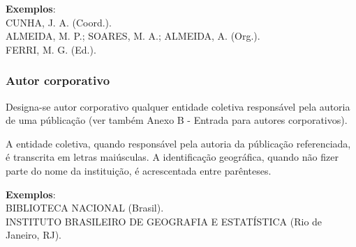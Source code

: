 \begin{exemplomanual}
\textbf{Exemplos}:\\
CUNHA, J. A. (Coord.).\\
ALMEIDA, M. P.; SOARES, M. A.; ALMEIDA, A. (Org.).\\
FERRI, M. G. (Ed.).
\end{exemplomanual}


\subsubsection{Autor corporativo}

Designa-se autor corporativo qualquer entidade coletiva responsável pela autoria de uma públicação (ver também Anexo B - Entrada para autores corporativos).

A entidade coletiva, quando responsável pela autoria da públicação referenciada, é transcrita em letras maiúsculas. A identificação geográfica, quando não fizer parte do nome da instituição, é acrescentada entre parênteses.

\begin{exemplomanual}
\textbf{Exemplos}:\\
BIBLIOTECA NACIONAL (Brasil).\\
INSTITUTO BRASILEIRO DE GEOGRAFIA E ESTATÍSTICA (Rio de Janeiro, RJ).
\end{exemplomanual}


